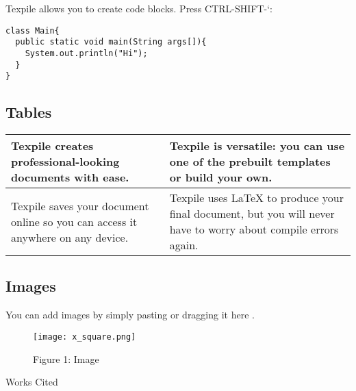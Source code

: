 \documentclass[12pt,letterpaper]{article}
\newenvironment{workscited}{\newpage\begin{center}Works Cited\end{center}}{\newpage}
\begin{document}
\begin{flushleft}
Texpile allows you to create code blocks. Press CTRL-SHIFT-`:

\begin{verbatim}
class Main{
  public static void main(String args[]){
    System.out.println("Hi");
  }
}
\end{verbatim}
\subsection{Tables}

\begin{tabularx}{\textwidth}{|X|X|}
\hline

Texpile creates professional-looking documents with ease.
 &
Texpile is versatile: you can use one of the prebuilt templates or build your own.
 \\\hline
Texpile saves your document online so you can access it anywhere on any device.
 &
Texpile uses LaTeX to produce your final document, but you will never have to worry about compile errors again.
 \\\hline
\end{tabularx}
\subsection{Images}

You can add images by simply pasting or dragging it here \cite{doe2021conference}.



\begin{figure}[h]
\centering
\texttt{[image: x\_square.png]}
\caption{Figure 1: Image}
\end{figure}



\end{flushleft}
\begin{workscited}\printbibliography[heading=none]\end{workscited}
\end{document}
